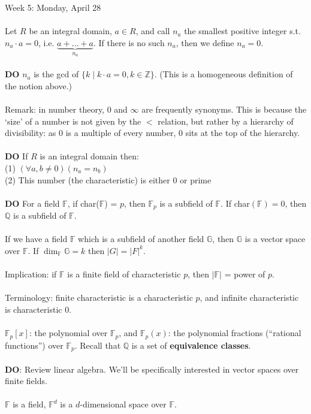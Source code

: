 \documentclass[12pt]{article}
\theoremstyle{remark}
\newcommand{\Z}{\mathbb{Z}}
\newcommand{\F}{\mathbb{F}}
\newcommand{\Q}{\mathbb{Q}}
\begin{document}
\begin{section}{Week 5: Monday, April 28}
\\\\
Let $R$ be an integral domain, $a \in R$, and call $n_a$ the smallest positive integer s.t. $n_a \cdot a = 0$, i.e. $\underbrace{a+\ldots+a}_{n_a}$. If there is no such $n_a$, then we define $n_a = 0$.
\\\\
\textbf{DO} $n_a$ is the gcd of $\{k \mid k \cdot a = 0, k \in \Z\}$. (This is a homogeneous definition of the notion above.)
\\\\Remark: in number theory, $0$ and $\infty$ are frequently synonyms. This is because the `size' of a number is not given by the $<$ relation, but rather by a hierarchy of divisibility: as $0$ is a multiple of every number, $0$ sits at the top of the hierarchy.
\\\\
 \textbf{DO} If $R$ is an integral domain then:
 \\(1) $(\forall a,b \neq 0)(n_a = n_b)$
 \\(2) This number (the characteristic) is either $0$ or prime
 \\\\\textbf{DO} For a field $\F$, if char($\F$) = $p$, then $\F_p$ is a subfield of $\F$. If char$(\F) = 0$, then $\Q$ is a subfield of $\F$.
 \\\\
 If we have a field $\F$ which is a subfield of another field $\mathbb{G}$, then $\mathbb{G}$ is a vector space over $\F$. If $\dim_\F \mathbb{G} = k$ then $|G|=|F|^k$.
 \\\\
 Implication: if $\F$ is a finite field of characteristic $p$, then $|\F|$ = power of $p$.
 \\\\
 Terminology: finite characteristic is a characteristic $p$, and infinite characteristic is characteristic $0$.
 \\\\
 $\F_p[x]$: the polynomial over $\F_p$, and $\F_p(x)$: the polynomial fractions (``rational functions'') over $\F_p$. Recall that $\Q$ is a set of \textbf{equivalence classes}. 
 \\\\
 \textbf{DO}: Review linear algebra. We'll be specifically interested in vector spaces over finite fields.
 \\\\
 $\F$ is a field, $\F^d$ is a $d$-dimensional space over $\F$. 

\end{section}
\end{document}
